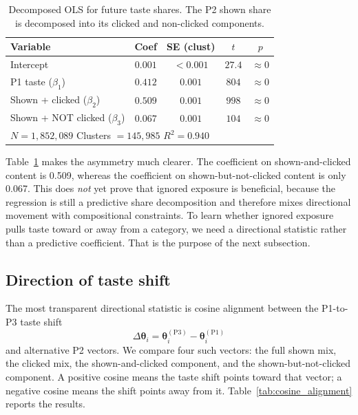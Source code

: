 \documentclass[11pt]{article}
\begin{document}
\begin{table}[ht]
\centering
\caption{Decomposed OLS for future taste shares. The P2 shown share is decomposed into its clicked and non-clicked components.}
\label{tab:decomposed_ols}
\begin{tabular}{lcccc}
\toprule
Variable & Coef & SE (clust) & $t$ & $p$ \\
\midrule
Intercept & $0.001$ & $<0.001$ & $27.4$ & $\approx 0$ \\
P1 taste ($\beta_1$) & $0.412$ & $0.001$ & $804$ & $\approx 0$ \\
Shown + clicked ($\beta_2$) & $\mathbf{0.509}$ & $0.001$ & $998$ & $\approx 0$ \\
Shown + NOT clicked ($\beta_3$) & $\mathbf{0.067}$ & $0.001$ & $104$ & $\approx 0$ \\
\midrule
\multicolumn{5}{l}{$N = 1{,}852{,}089$ \quad Clusters $= 145{,}985$ \quad $R^2 = 0.940$} \\
\bottomrule
\end{tabular}
\end{table}
\FloatBarrier

Table~\ref{tab:decomposed_ols} makes the asymmetry much clearer. The coefficient on shown-and-clicked content is 0.509, whereas the coefficient on shown-but-not-clicked content is only 0.067. This does \emph{not} yet prove that ignored exposure is beneficial, because the regression is still a predictive share decomposition and therefore mixes directional movement with compositional constraints. To learn whether ignored exposure pulls taste toward or away from a category, we need a directional statistic rather than a predictive coefficient. That is the purpose of the next subsection.

\subsection{Direction of taste shift}

The most transparent directional statistic is cosine alignment between the P1-to-P3 taste shift
\[
\Delta\boldsymbol{\theta}_i
=
\boldsymbol{\theta}_i^{(\mathrm{P3})}
-
\boldsymbol{\theta}_i^{(\mathrm{P1})}
\]
and alternative P2 vectors. We compare four such vectors: the full shown mix, the clicked mix, the shown-and-clicked component, and the shown-but-not-clicked component. A positive cosine means the taste shift points toward that vector; a negative cosine means the shift points away from it. Table~\ref{tab:cosine_alignment} reports the results.
\end{document}
